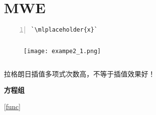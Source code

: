 \chapter{MWE}

\begin{lstlisting}[frame=single,numbers=left]
`\mlplaceholder{x}`
\end{lstlisting}

\begin{lstlisting}
\end{lstlisting}



\begin{problem}
\end{problem}

\begin{solution}
\end{solution}

\begin{figure}[htbp]
\centering
\texttt{[image: exampe2\_1.png]}
\caption{}
\end{figure}

\begin{definition}{}{}
\[\]
\end{definition}

\begin{note}
拉格朗日插值多项式次数高，不等于插值效果好！
\end{note}

\textcolor{third}{\textbf{方程组}}

\ref{func}
